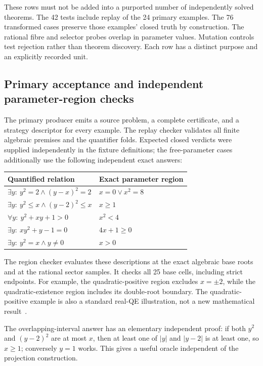 These rows must not be added into a purported number of independently solved theorems. The 42 tests include replay of the 24 primary examples. The 76 transformed cases preserve those examples' closed truth by construction. The rational fibre and selector probes overlap in parameter values. Mutation controls test rejection rather than theorem discovery. Each row has a distinct purpose and an explicitly recorded unit.

\subsection{Primary acceptance and independent parameter-region checks}
The primary producer emits a source problem, a complete certificate, and a strategy descriptor for every example. The replay checker validates all finite algebraic premises and the quantifier folds. Expected closed verdicts were supplied independently in the fixture definitions; the free-parameter cases additionally use the following independent exact answers:
\begin{center}
\begin{tabular}{p{}p{}}
\toprule
Quantified relation & Exact parameter region\\
\midrule
$\exists y:\ y^2=2\wedge(y-x)^2=2$ & $x=0\vee x^2=8$\\
$\exists y:\ y^2\leq x\wedge(y-2)^2\leq x$ & $x\geq1$\\
$\forall y:\ y^2+xy+1>0$ & $x^2<4$\\
$\exists y:\ xy^2+y-1=0$ & $4x+1\geq0$\\
$\exists y:\ y^2=x\wedge y\ne0$ & $x>0$\\
\bottomrule
\end{tabular}
\end{center}

The region checker evaluates these descriptions at the exact algebraic base roots and at the rational sector samples. It checks all 25 base cells, including strict endpoints. For example, the quadratic-positive region excludes $x=\pm2$, while the quadratic-existence region includes its double-root boundary. The quadratic-positive example is also a standard real-QE illustration, not a new mathematical result~\cite{england}.

The overlapping-interval answer has an elementary independent proof: if both $y^2$ and $(y-2)^2$ are at most $x$, then at least one of $|y|$ and $|y-2|$ is at least one, so $x\geq1$; conversely $y=1$ works. This gives a useful oracle independent of the projection construction.

